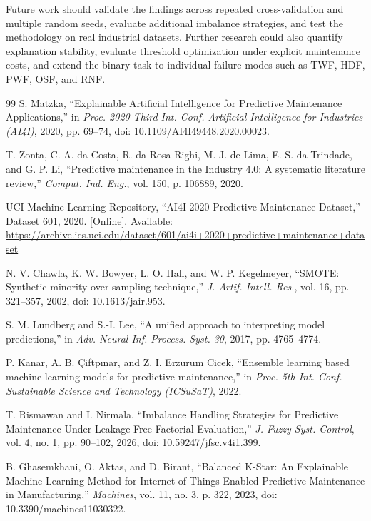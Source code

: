 \documentclass[conference]{IEEEtran}
\begin{document}
Future work should validate the findings across repeated cross-validation and multiple random seeds, evaluate additional imbalance strategies, and test the methodology on real industrial datasets. Further research could also quantify explanation stability, evaluate threshold optimization under explicit maintenance costs, and extend the binary task to individual failure modes such as TWF, HDF, PWF, OSF, and RNF.

\begin{thebibliography}{99}
S. Matzka, ``Explainable Artificial Intelligence for Predictive Maintenance Applications,'' in \textit{Proc. 2020 Third Int. Conf. Artificial Intelligence for Industries (AI4I)}, 2020, pp. 69--74, doi: 10.1109/AI4I49448.2020.00023.

T. Zonta, C. A. da Costa, R. da Rosa Righi, M. J. de Lima, E. S. da Trindade, and G. P. Li, ``Predictive maintenance in the Industry 4.0: A systematic literature review,'' \textit{Comput. Ind. Eng.}, vol. 150, p. 106889, 2020.

UCI Machine Learning Repository, ``AI4I 2020 Predictive Maintenance Dataset,'' Dataset 601, 2020. [Online]. Available: \url{https://archive.ics.uci.edu/dataset/601/ai4i+2020+predictive+maintenance+dataset}

N. V. Chawla, K. W. Bowyer, L. O. Hall, and W. P. Kegelmeyer, ``SMOTE: Synthetic minority over-sampling technique,'' \textit{J. Artif. Intell. Res.}, vol. 16, pp. 321--357, 2002, doi: 10.1613/jair.953.

S. M. Lundberg and S.-I. Lee, ``A unified approach to interpreting model predictions,'' in \textit{Adv. Neural Inf. Process. Syst. 30}, 2017, pp. 4765--4774.

P. Kanar, A. B. Çiftpınar, and Z. I. Erzurum Cicek, ``Ensemble learning based machine learning models for predictive maintenance,'' in \textit{Proc. 5th Int. Conf. Sustainable Science and Technology (ICSuSaT)}, 2022.

T. Rismawan and I. Nirmala, ``Imbalance Handling Strategies for Predictive Maintenance Under Leakage-Free Factorial Evaluation,'' \textit{J. Fuzzy Syst. Control}, vol. 4, no. 1, pp. 90--102, 2026, doi: 10.59247/jfsc.v4i1.399.

B. Ghasemkhani, O. Aktas, and D. Birant, ``Balanced K-Star: An Explainable Machine Learning Method for Internet-of-Things-Enabled Predictive Maintenance in Manufacturing,'' \textit{Machines}, vol. 11, no. 3, p. 322, 2023, doi: 10.3390/machines11030322.


\end{thebibliography}
\end{document}
